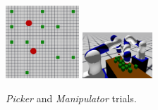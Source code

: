 %

\begin{figure}[h]
\vspace{-0.1in}
	\centering
		\includegraphics[width=0.245\textwidth,trim={1cm 9cm 1cm 5cm},clip]{figures/simple_picker_benchmark}
		\includegraphics[width=0.235\textwidth]{figures/kuka_benchmark2}
		\caption{\textit{Picker} and \textit{Manipulator} trials.}
		\label{fig:benchmarks}
\vspace{-0.1in}
\end{figure}


